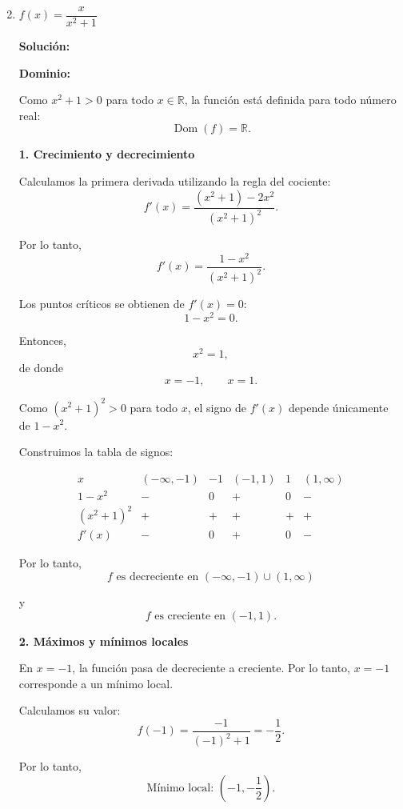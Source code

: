 \documentclass[12pt]{article}
\newcommand{\solucion}{%
    \vspace{0.8em}%
    \textbf{Solución:}%
}
\begin{document}
\begin{enumerate}[label=\roman*.-]

    \setcounter{enumi}{1} %

    \item $f(x) = \dfrac{x}{x^2 + 1}$

    \solucion

    \textbf{Dominio:}

    Como $x^2+1>0$ para todo $x\in\mathbb{R}$, la función está definida
    para todo número real:
    \[
    \operatorname{Dom}(f)=\mathbb{R}.
    \]

    \textbf{1. Crecimiento y decrecimiento}

    Calculamos la primera derivada utilizando la regla del cociente:
    \[
    f'(x)
    =
    \frac{(x^2+1)-2x^2}{(x^2+1)^2}.
    \]

    Por lo tanto,
    \[
    f'(x)=\frac{1-x^2}{(x^2+1)^2}.
    \]

    Los puntos críticos se obtienen de $f'(x)=0$:
    \[
    1-x^2=0.
    \]

    Entonces,
    \[
    x^2=1,
    \]
    de donde
    \[
    x=-1,\qquad x=1.
    \]

    Como $(x^2+1)^2>0$ para todo $x$, el signo de $f'(x)$ depende
    únicamente de $1-x^2$.

    Construimos la tabla de signos:

    \[
    \begin{array}{c|ccccc}
    x & (-\infty,-1) & -1 & (-1,1) & 1 & (1,\infty)\\
    \hline
    1-x^2 & - & 0 & + & 0 & -\\
    (x^2+1)^2 & + & + & + & + & +\\
    \hline
    f'(x) & - & 0 & + & 0 & -
    \end{array}
    \]

    Por lo tanto,
    \[
    \boxed{
    f \text{ es decreciente en }
    (-\infty,-1)\cup(1,\infty)
    }
    \]

    y
    \[
    \boxed{
    f \text{ es creciente en }(-1,1)
    }.
    \]

    \textbf{2. Máximos y mínimos locales}

    En $x=-1$, la función pasa de decreciente a creciente. Por lo tanto,
    $x=-1$ corresponde a un mínimo local.

    Calculamos su valor:
    \[
    f(-1)
    =
    \frac{-1}{(-1)^2+1}
    =
    -\frac12.
    \]

    Por lo tanto,
    \[
    \boxed{
    \text{Mínimo local: }
    \left(-1,-\frac12\right)
    }.
    \]


\end{enumerate}
\end{document}

